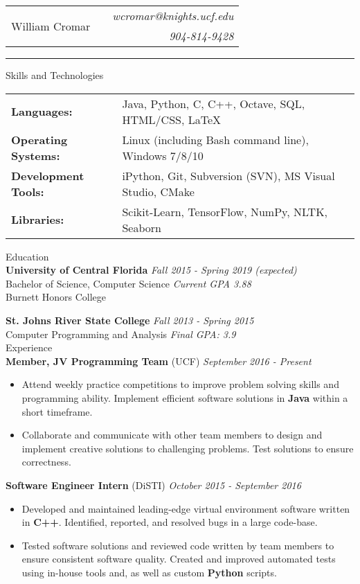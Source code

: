 \documentclass[letterpaper,11pt,oneside]{article}
\newcommand{\mkheader}[3]{
  {\fontfamily{pag}\selectfont
  \begin{tabularx}{\textwidth}{lXr}
    \multirow{2}{*}{\Huge #1} && \emph{#2}
    \\ && \emph{#3}
  \end{tabularx}
  }
  \vspace{2pt}
  \hrule
}
\newcommand{\resheader}[2][]{
  \vspace{9pt}
  {\LARGE #2} #1
  \\
}
\newcommand{\ressubheader}[3][]{
  \vspace{6pt}
  {\large \textbf{#2} #1} \hfill \emph{#3}
  \\
}
\newcommand{\resskill}[1]{\textbf{#1}}
\begin{document}
\mkheader{William Cromar}{wcromar@knights.ucf.edu}{904-814-9428}

\resheader{Skills and Technologies}
\vspace{6pt}
\begin{tabular}{>{\bfseries}l@{\hskip .25cm} l}
  Languages: & Java, Python, C, C++, Octave, SQL, HTML/CSS, LaTeX \\
  Operating Systems: & Linux (including Bash command line), Windows 7/8/10 \\
  Development Tools: & iPython, Git, Subversion (SVN), MS Visual Studio, CMake \\
  Libraries: & Scikit-Learn, TensorFlow, NumPy, NLTK, Seaborn
\end{tabular}


\resheader{Education}
\ressubheader{University of Central Florida}{Fall 2015 - Spring 2019 (expected)}
Bachelor of Science, Computer Science \hfill \emph{Current GPA 3.88} \\
Burnett Honors College

\ressubheader{St. Johns River State College}{Fall 2013 - Spring 2015}
Computer Programming and Analysis \hfill \emph{Final GPA: 3.9} \\

\resheader{Experience}
\ressubheader[(UCF)]{Member, JV Programming Team}{September 2016 - Present}
\begin{itemize}
  \item Attend weekly practice competitions to improve problem solving skills
    and programming ability. Implement efficient software solutions in
    \resskill{Java} within a short timeframe. 
  \item Collaborate and communicate with other team members to design and
    implement creative solutions to challenging problems. Test solutions to
    ensure correctness.
\end{itemize}

\ressubheader[(DiSTI)]{Software Engineer Intern}{October 2015 - September 2016}
\begin{itemize}
  \item Developed and maintained leading-edge virtual environment software
    written in \resskill{C++}. Identified, reported, and resolved bugs in a
    large code-base.
    \item Tested software solutions and reviewed code written by team members to
      ensure consistent software quality. Created and improved automated tests
      using in-house tools and, as well as custom \resskill{Python} scripts.
\end{itemize}
\end{document}
